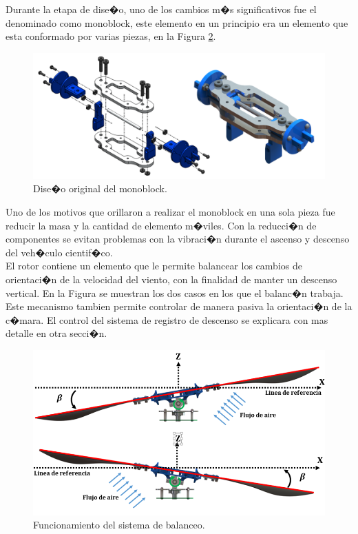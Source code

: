 \documentclass[10pt,a4paper]{book}
\begin{document}
Durante la etapa de dise�o, uno de los cambios m�s significativos fue el denominado como monoblock, este elemento en un principio era un elemento que esta conformado por varias piezas, en la Figura \ref{img:Monoblock}. 

\begin{figure}[H]
\begin{center}
\includegraphics[scale=0.32]{Imagenes/Monoblock.png}  
\caption{Dise�o original del monoblock. \label{img:Monoblock}}
\end{center}
\end{figure}

Uno de los motivos que orillaron a realizar el monoblock en una sola pieza fue reducir la masa y la cantidad de elemento m�viles. Con la reducci�n de componentes se evitan problemas con la vibraci�n durante el ascenso y descenso del veh�culo cientif�co.\\ 

El rotor contiene un elemento que le permite balancear los cambios de orientaci�n de la velocidad del viento, con la finalidad de manter un descenso vertical. En la Figura se muestran los dos casos en los que el balanc�n trabaja. Este mecanismo tambien permite controlar de manera pasiva la orientaci�n de la c�mara. El control del sistema de registro de descenso se explicara con mas detalle en otra secci�n.

\begin{figure}[H]
\begin{center}
\includegraphics[scale=0.55]{Imagenes/Balanceo.png}  
\caption{Funcionamiento del sistema de balanceo. \label{img:Monoblock}}
\end{center}
\end{figure}
\end{document}
